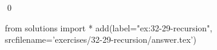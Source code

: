 
\begin{ex}
  \label{ex:32-29-recursion}
  
  \qed
\end{ex}
\begin{python0}
from solutions import *
add(label="ex:32-29-recursion",
    srcfilename='exercises/32-29-recursion/answer.tex')
\end{python0}
